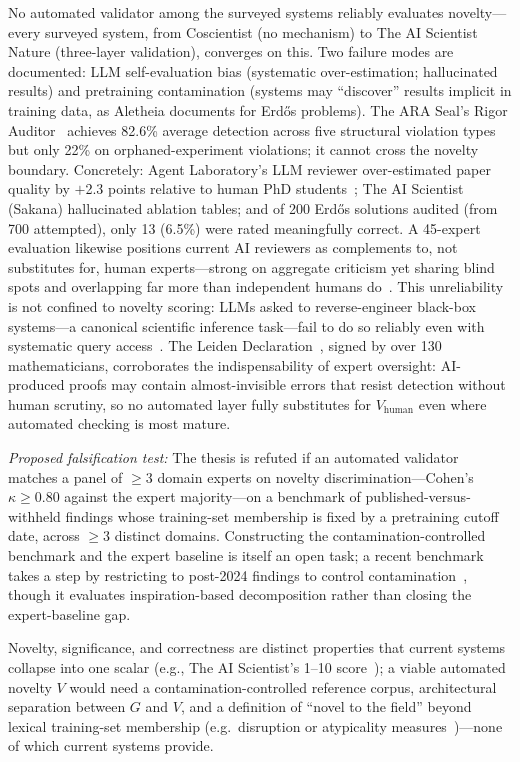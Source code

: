\documentclass{article}
\begin{document}
No automated validator among the surveyed systems reliably evaluates novelty---every surveyed system, from Coscientist (no mechanism) to The AI Scientist Nature (three-layer validation), converges on this. Two failure modes are documented: LLM self-evaluation bias (systematic over-estimation; hallucinated results) and pretraining contamination (systems may ``discover'' results implicit in training data, as Aletheia documents for Erd\H{o}s problems). The ARA Seal's Rigor Auditor~\citep{liu2026lasthuman} achieves 82.6\% average detection across five structural violation types but only 22\% on orphaned-experiment violations; it cannot cross the novelty boundary. Concretely: Agent Laboratory's LLM reviewer over-estimated paper quality by $+$2.3 points relative to human PhD students~\citep{schmidgall2025agentlab}; The AI Scientist (Sakana) hallucinated ablation tables; and of 200 Erd\H{o}s solutions audited (from 700 attempted), only 13 (6.5\%) were rated meaningfully correct. A 45-expert evaluation likewise positions current AI reviewers as complements to, not substitutes for, human experts---strong on aggregate criticism yet sharing blind spots and overlapping far more than independent humans do~\citep{kim2026aireviewers}. This unreliability is not confined to novelty scoring: LLMs asked to reverse-engineer black-box systems---a canonical scientific inference task---fail to do so reliably even with systematic query access~\citep{geng2025reliable}. The Leiden Declaration~\citep{leiden2026}, signed by over 130 mathematicians, corroborates the indispensability of expert oversight: AI-produced proofs may contain almost-invisible errors that resist detection without human scrutiny, so no automated layer fully substitutes for $V_\text{human}$ even where automated checking is most mature.

\textit{Proposed falsification test:} The thesis is refuted if an automated validator matches a panel of $\geq$3 domain experts on novelty discrimination---Cohen's $\kappa \geq 0.80$ against the expert majority---on a benchmark of published-versus-withheld findings whose training-set membership is fixed by a pretraining cutoff date, across $\geq$3 distinct domains. Constructing the contamination-controlled benchmark and the expert baseline is itself an open task; a recent benchmark takes a step by restricting to post-2024 findings to control contamination~\citep{liu2025researchbench}, though it evaluates inspiration-based decomposition rather than closing the expert-baseline gap.

Novelty, significance, and correctness are distinct properties that current systems collapse into one scalar (e.g., The AI Scientist's 1--10 score~\citep{lu2024aiscientist}); a viable automated novelty $V$ would need a contamination-controlled reference corpus, architectural separation between $G$ and $V$, and a definition of ``novel to the field'' beyond lexical training-set membership (e.g.\ disruption or atypicality measures~\citep{park2023disruptive,uzzi2013atypical})---none of which current systems provide.
\end{document}
